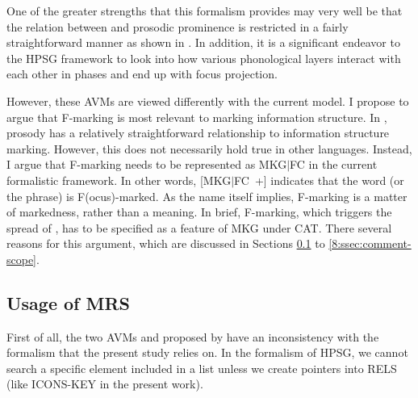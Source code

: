 

\noindent One of the greater strengths that this formalism provides
may very well be that the relation between  and prosodic
prominence is restricted in a fairly straightforward manner as shown
in . In addition, it is a
significant endeavor to the HPSG framework to look into how various
phonological layers interact with each other in phases and end up with
focus projection.


However, these AVMs are viewed differently with the current model.  I
propose to argue that F-marking is most relevant to marking
information structure. In , prosody has a
relatively straightforward relationship to information structure
marking. However, this does not necessarily hold true in other
languages.  Instead, I argue that F-marking needs to be represented as
MKG{$\mid$}FC in the current formalistic framework. In other words,
\mbox{[MKG{$\mid$}FC +]} indicates that the word (or the phrase) is
F(ocus)-marked. As the name itself implies, F-marking is a
matter of markedness, rather than a meaning. In brief, F-marking,
which triggers the spread of , has to be specified as a
feature of MKG under CAT. There several reasons for this argument,
which are discussed in Sections \ref{8:ssec:usage} to
\ref{8:ssec:comment-scope}.



\subsection{Usage of MRS}
\label{8:ssec:usage}


First of all, the two AVMs
 and
 proposed by
\citet{bildhauer:07} have an inconsistency with the 
formalism that the present study relies on.  In the 
formalism of HPSG, we cannot search a specific element
included in a list unless we create pointers into RELS (like ICONS-KEY
in the present work).






